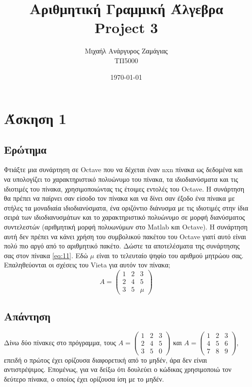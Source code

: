 \documentclass[12pt, fleqn, leqno]{extreport}
\begin{document}
\title{Αριθμητική Γραμμική Άλγεβρα\\Project 3}
\author{Μιχαήλ Ανάργυρος Ζαμάγιας\\ΤΠ5000}
\date{\today}
\maketitle
\newpage

\tableofcontents

\chapter{Άσκηση 1}

\section{Ερώτημα}
Φτιάξτε μια συνάρτηση σε Octave που να δέχεται έναν nxn πίνακα ως δεδομένα και να υπολογίζει το χαρακτηριστικό πολυώνυμο του πίνακα, τα ιδιοδιανύσματα και τις ιδιοτιμές του πίνακα, χρησιμοποιώντας τις έτοιμες εντολές του Octave. Η συνάρτηση θα πρέπει να παίρνει σαν είσοδο τον πίνακα και να δίνει σαν έξοδο ένα πίνακα με στήλες τα μοναδιαία ιδιοδιανύσματα, ένα οριζόντιο διάνυσμα με τις ιδιοτιμές στην ίδια σειρά των ιδιοδιανυσμάτων και το χαρακτηριστικό πολυώνυμο σε μορφή διανύσματος συντελεστών (αριθμητική μορφή πολυωνύμων στο Matlab και Octave). Η συνάρτηση αυτή δεν πρέπει να κάνει χρήση του συμβολικού πακέτου του Octave γιατί αυτό είναι πολύ πιο αργό από το αριθμητικό πακέτο. Δώστε τα αποτελέσματα της συνάρτησης σας στον πίνακα \eqref{eq:11}. Εδώ $\mu$ είναι το τελευταίο ψηφίο του αριθμού μητρώου σας. Επαληθεύονται οι σχέσεις του Vieta για αυτόν τον πίνακα;
\begin{equation}%
    A = \begin{pmatrix}
        1 & 2 & 3   \\
        2 & 4 & 5   \\
        3 & 5 & \mu
    \end{pmatrix}\label{eq:11}
\end{equation}

\newpage
\section{Απάντηση}

Δίνω δύο πίνακες στο πρόγραμμα, τους $ A = \begin{pmatrix}
    1 & 2 & 3 \\
    2 & 4 & 5 \\
    3 & 5 & 0
\end{pmatrix} $ και $ A = \begin{pmatrix}
    1 & 2 & 3 \\
    4 & 5 & 6 \\
    7 & 8 & 9
\end{pmatrix} $, επειδή ο πρώτος έχει ορίζουσα διαφορετική από το μηδέν, άρα δεν είναι αντιστρέψιμος. Επομένως, για να δείξω ότι δουλεύει ο κώδικας χρησιμοποιώ τον δεύτερο πίνακα, ο οποίος έχει ορίζουσα ίση με το μηδέν.
\end{document}
